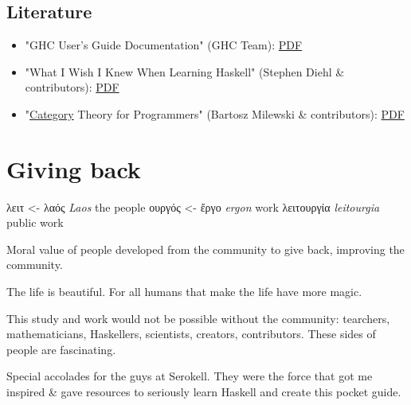 \documentclass[a4paper,14pt,oneside]{book}
\begin{document}
\chapter{Literature}
\label{sec:orga4e2eea}

\begin{itemize}
\item "GHC User’s Guide Documentation" (GHC Team): \href{https://downloads.haskell.org/\~ghc/latest/docs/users\_guide.pdf}{PDF}
\item "What I Wish I Knew When Learning Haskell" (Stephen Diehl \& contributors): \href{http://dev.stephendiehl.com/hask/tutorial.pdf}{PDF}
\item "\hyperref[orge2f27c1]{Category} Theory for Programmers" (Bartosz Milewski \& contributors): \href{https://s3.amazonaws.com/milewski-ctfp-pdf/category-theory-for-programmers.pdf}{PDF}
\end{itemize}

\part{Giving back}
\label{sec:orgfae1907}

\textgreek{λειτ}       <- \textgreek{λαός}  \emph{Laos}       the people
    \textgreek{ουργός} <- \textgreek{ἔργο}  \emph{ergon}             work
\textgreek{λειτουργία}          \emph{leitourgia} public work

Moral value of people developed from the community to give back, improving the community.

The life is beautiful.
For all humans that make the life have more magic.

This study and work would not be possible without the community: tearchers, mathematicians, Haskellers, scientists, creators, contributors. These sides of people are fascinating.


Special accolades for the guys at Serokell. They were the force that got me inspired \& gave resources to seriously learn Haskell and create this pocket guide.
\end{document}
